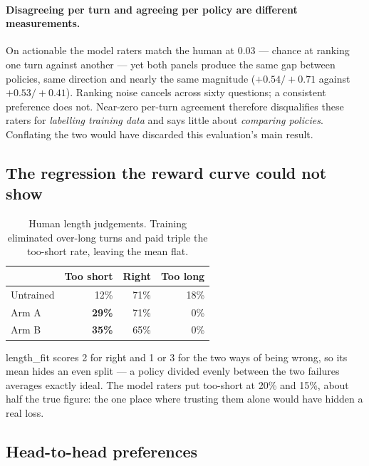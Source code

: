 \documentclass[11pt]{article}
\newcommand{\qual}[1]{\textsf{#1}}
\begin{document}
\paragraph{Disagreeing per turn and agreeing per policy are different measurements.} On
\qual{actionable} the model raters match the human at 0.03 --- chance at ranking one turn against
another --- yet both panels produce the same gap between policies, same direction and nearly the same
magnitude ($+0.54/+0.71$ against $+0.53/+0.41$). Ranking noise cancels across sixty questions; a
consistent preference does not. Near-zero per-turn agreement therefore disqualifies these raters for
\emph{labelling training data} and says little about \emph{comparing policies}. Conflating the two would
have discarded this evaluation's main result.

\subsection{The regression the reward curve could not show}

\begin{table}[h]
\centering
\begin{tabular}{lrrr}
\toprule
& \textbf{Too short} & \textbf{Right} & \textbf{Too long} \\
\midrule
Untrained & 12\% & 71\% & 18\% \\
Arm A     & \textbf{29\%} & 71\% & 0\% \\
Arm B     & \textbf{35\%} & 65\% & 0\% \\
\bottomrule
\end{tabular}
\caption{Human length judgements. Training eliminated over-long turns and paid triple the too-short
rate, leaving the mean flat.}
\label{tab:length}
\end{table}

\qual{length\_fit} scores 2 for right and 1 or 3 for the two ways of being wrong, so its mean hides an
even split --- a policy divided evenly between the two failures averages exactly ideal. The model raters
put too-short at 20\% and 15\%, about half the true figure: the one place where trusting them alone
would have hidden a real loss.

\subsection{Head-to-head preferences}
\end{document}
